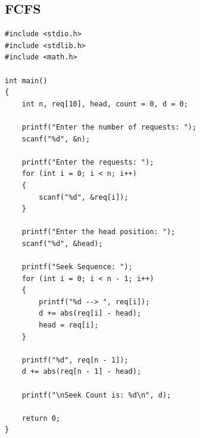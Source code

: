 \subsection{FCFS}
\begin{lstlisting}[label={list:c_program:queue}]
#include <stdio.h>
#include <stdlib.h>
#include <math.h>

int main()
{
    int n, req[10], head, count = 0, d = 0;

    printf("Enter the number of requests: ");
    scanf("%d", &n);

    printf("Enter the requests: ");
    for (int i = 0; i < n; i++)
    {
        scanf("%d", &req[i]);
    }

    printf("Enter the head position: ");
    scanf("%d", &head);

    printf("Seek Sequence: ");
    for (int i = 0; i < n - 1; i++)
    {
        printf("%d --> ", req[i]);
        d += abs(req[i] - head);
        head = req[i];
    }

    printf("%d", req[n - 1]);
    d += abs(req[n - 1] - head);

    printf("\nSeek Count is: %d\n", d);

    return 0;
}

\end{lstlisting}
